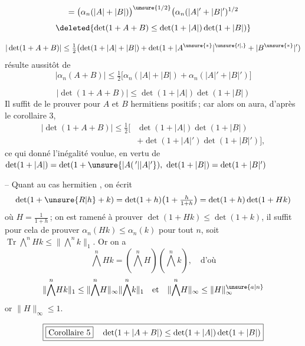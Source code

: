 \[
=\bigl(\alpha_n(|A|+|B|)\bigr)^{\unsure{1/2}}\bigl(\alpha_n(|A|'+|B|')^{1/2}
\]
\[
\deleted{\det(1+A+B)\leq\det(1+|A|)\det(1+|B|)}
\]

\[
|\det(1+A+B)|\leq\tfrac12\bigl(\det(1+|A|+|B|)+\det(1+|A^{\unsure{*}}|^{\unsure{\prime|,}}+|B^{\unsure{*}}|')
\]
résulte aussitôt de
\[
|\alpha_n(A+B)|\leq\tfrac12\bigl[\alpha_n(|A|+|B|)+\alpha_n(|A|'+|B|')\bigr]
\]

\[
\boxed{|\det(1+A+B)|\leq\det(1+|A|)\det(1+|B|)}
\]
Il suffit de  le prouver pour $A$ et $B$
hermitiens positifs\,; car alors on aura, d'après
le corollaire 3,
\[
\begin{aligned}
|\det(1+A+B)|\leq\tfrac12\bigl[&\det(1+|A|)\det(1+|B|)\\
&+\det(1+|A|')\det(1+|B|')\bigr],
\end{aligned}
\]
ce qui donné l'inégalité voulue, en vertu de
$\det(1+|A|)=\det(1+\unsure{\lvert A(\,{}'|\lvert A\rvert'}),\ \det(1+|B|)=\det(1+|B|')$

-- Quant au cas hermitien , on écrit
\[
\det(1+\unsure{R|h}+k)=\det(1+h)\bigl(1+\tfrac{h}{1+h}\bigr)=\det(1+h)\det(1+Hk)
\]
où $H=\frac{1}{1+h}$\,; on est ramené à prouver
$\det(1+Hk)\leq\det(1+k)$, il suffit pour cela
de prouver $\alpha_n(Hk)\leq\alpha_n(k)$ pour tout $n$,
soit $\operatorname{Tr}\overset{n}{\bigwedge}Hk\leq\|\overset{n}{\bigwedge}k\|_1$. Or on a
\[
\overset{n}{\bigwedge}Hk=(\overset{n}{\bigwedge}H)(\overset{n}{\bigwedge}k),\quad\text{d'où}
\]
\[
\|\overset{n}{\bigwedge}Hk\|_1\leq\|\overset{n}{\bigwedge}H\|_\infty\|\overset{n}{\bigwedge}k\|_1
\quad\text{et}\quad\|\overset{n}{\bigwedge}H\|_\infty\leq\|H\|_\infty^{\unsure{a|n}}
\]
\margin{!}or $\|H\|_\infty\leq1$.

\[
\boxed{\text{\fbox{Corollaire 5}}\quad\det(1+|A+B|)\leq\det(1+|A|)\det(1+|B|)}
\]
